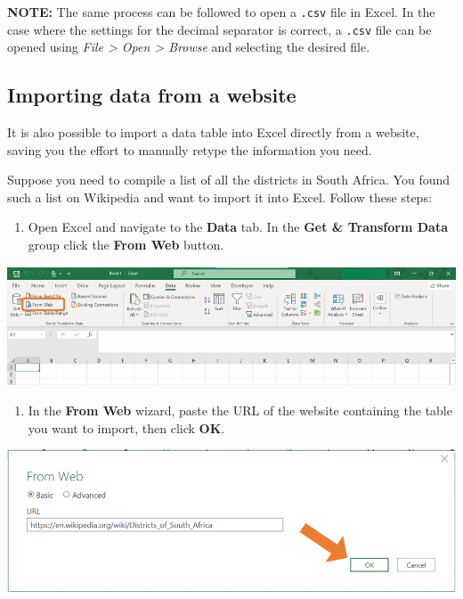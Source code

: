 \documentclass[
]{book}
\providecommand{\tightlist}{%
  \setlength{\itemsep}{0pt}\setlength{\parskip}{0pt}}
\begin{document}
\textbf{NOTE:} The same process can be followed to open a \texttt{.csv} file in Excel. In the case where the settings for the decimal separator is correct, a \texttt{.csv} file can be opened using \textit{File > Open > Browse} and selecting the desired file.

\subsection{Importing data from a website}\label{importing-data-from-a-website}

It is also possible to import a data table into Excel directly from a website, saving you the effort to manually retype the information you need.

Suppose you need to compile a list of all the districts in South Africa. You found such a list on Wikipedia and want to import it into Excel. Follow these steps:

\begin{enumerate}
\def\labelenumi{\arabic{enumi}.}
\tightlist
\item
  Open Excel and navigate to the \textbf{Data} tab. In the \textbf{Get \& Transform Data} group click the \textbf{From Web} button.
\end{enumerate}

\begin{center}\includegraphics[width=0.7\linewidth]{Figures/web_1} \end{center}

\newpage

\begin{enumerate}
\def\labelenumi{\arabic{enumi}.}
\setcounter{enumi}{1}
\tightlist
\item
  In the \textbf{From Web} wizard, paste the URL of the website containing the table you want to import, then click \textbf{OK}.
\end{enumerate}

\begin{center}\includegraphics[width=0.6\linewidth]{Figures/web_2} \end{center}
\end{document}
